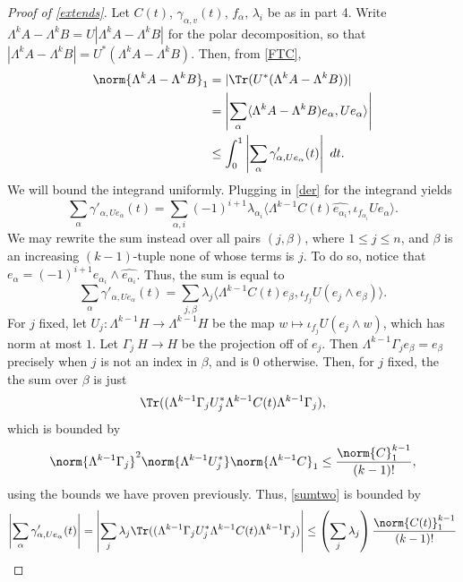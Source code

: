 \documentclass[12pt]{amsart}
\begin{document}
\begin{proof}[Proof of \cref{extends}]
Let $C(t)$, $\gamma_{\alpha,v}(t)$, $f_\alpha$, $\lambda_i$ be as in part 4. Write $\Lambda^k A - \Lambda^k B = U|\Lambda^k A - \Lambda^k B|$ for the polar decomposition, so that $|\Lambda^k A - \Lambda^k B| = U^\ast(\Lambda^k A - \Lambda^k B)$. Then, from \eqref{FTC},
\begin{align}
\label{tobeplug}
\begin{split}
\norm{\Lambda^k A - \Lambda^k B}_1 &= |\Tr(U^\ast(\Lambda^k A - \Lambda^k B))|\\
&= \left|\sum_{\alpha} \langle \Lambda^k A - \Lambda^k B)e_{\alpha},Ue_{\alpha}\rangle\right|\\
&\leq \int_0^1 \left|\sum_{\alpha} \gamma_{\alpha,Ue_{\alpha}}'(t)\right|\ dt.
\end{split}
\end{align}
We will bound the integrand uniformly. Plugging in \eqref{der} for the integrand yields
\begin{equation}\label{sum}\sum_{\alpha} \gamma'_{\alpha,Ue_\alpha}(t) = \sum_{\alpha,i}(-1)^{i+1}\lambda_{\alpha_i}\langle  \Lambda^{k-1}C(t)\widehat{e_{\alpha_i}},\iota_{f_{\alpha_i}}Ue_\alpha\rangle.\end{equation} We may rewrite the sum instead over all pairs $(j,\beta)$, where $1 \leq j \leq n$, and $\beta$ is an increasing $(k-1)$-tuple none of whose terms is $j$. To do so, notice that $e_\alpha = (-1)^{i+1}e_{\alpha_i}\wedge \widehat{e_{\alpha_i}}$. Thus, the sum is equal to
\begin{equation}\label{sumtwo}\sum_{\alpha} \gamma'_{\alpha,Ue_\alpha}(t)  = \sum_{j,\beta}\lambda_j\langle \Lambda^{k-1}C(t)e_\beta,\iota_{f_{j}}U(e_j\wedge e_\beta)\rangle.\end{equation} For $j$ fixed, let $U_j:\Lambda^{k-1}H \to\Lambda^{k-1}H$ be the map $w \mapsto \iota_{f_{j}}U(e_j\wedge w)$, which has norm at most $1$.  Let $\Gamma_j\: H \to H$ be the projection off of $e_j$. Then $\Lambda^{k-1}\Gamma_j e_\beta = e_\beta$ precisely when $j$ is not an index in $\beta$, and is $0$ otherwise. Then, for $j$ fixed, the the sum over $\beta$ is just
\[\Tr((\Lambda^{k-1}\Gamma_j U_j^\ast\Lambda^{k-1}C(t)\Lambda^{k-1}\Gamma_j),\]
which is bounded by 
\[\norm{\Lambda^{k-1}\Gamma_j}^2\norm{\Lambda^{k-1}U_j^\ast}\norm{\Lambda^{k-1} C}_1 \leq \frac{\norm{C}_1^{k-1}}{(k-1)!},\]
using the bounds we have proven previously. Thus, \eqref{sumtwo} is bounded by
\begin{align}
\label{dsd}
\begin{split}
\left|\sum_{\alpha} \gamma'_{\alpha,Ue_\alpha}(t)\right| = \left|\sum_j \lambda_j \Tr((\Lambda^{k-1}\Gamma_j U_j^\ast\Lambda^{k-1}C(t)\Lambda^{k-1}\Gamma_j)\right| &\leq \left(\sum_j \lambda_j\right)\frac{\norm{C(t)}_1^{k-1}}{(k-1)!} \\

\end{split}
\end{align}
\end{proof}
\end{document}
